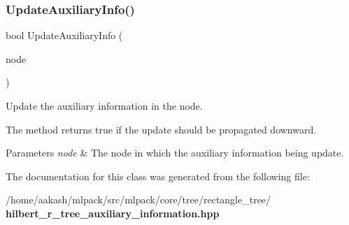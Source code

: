 \subsubsection{Update\+Auxiliary\+Info()}
{\footnotesize\ttfamily bool Update\+Auxiliary\+Info (\begin{DoxyParamCaption}\item[{Tree\+Type $\ast$}]{node }\end{DoxyParamCaption})}



Update the auxiliary information in the node. 

The method returns true if the update should be propagated downward.


\begin{DoxyParams}{Parameters}
{\em node} & The node in which the auxiliary information being update. \\
\hline
\end{DoxyParams}


The documentation for this class was generated from the following file\+:\begin{DoxyCompactItemize}
\item 
/home/aakash/mlpack/src/mlpack/core/tree/rectangle\+\_\+tree/\textbf{ hilbert\+\_\+r\+\_\+tree\+\_\+auxiliary\+\_\+information.\+hpp}\end{DoxyCompactItemize}
